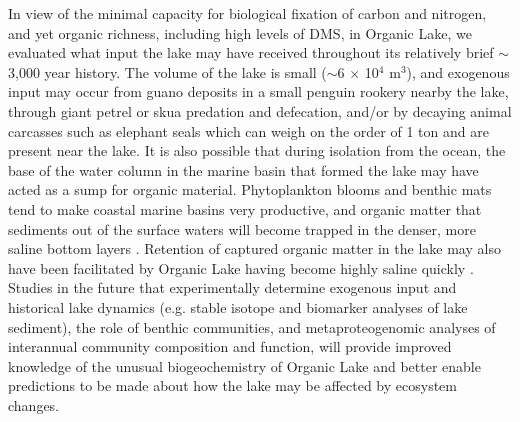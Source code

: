 In view of the minimal capacity for biological fixation of carbon and nitrogen, and yet organic richness, including high levels of \ac{DMS}, in Organic Lake, we evaluated what input the lake may have received throughout its relatively brief $\sim$3,000 year history. 
The volume of the lake is small ($\sim$6 $\times$ 10$^4$ m$^3$), and exogenous input may occur from guano deposits in a small penguin rookery nearby the lake, through giant petrel or skua predation and defecation, and/or by decaying animal carcasses such as elephant seals which can weigh on the order of 1 ton and are present near the lake. 
It is also possible that during isolation from the ocean, the base of the water column in the marine basin that formed the lake may have acted as a sump for organic material. 
Phytoplankton blooms and benthic mats tend to make coastal marine basins very productive, and organic matter that sediments out of the surface waters will become trapped in the denser, more saline bottom layers \cite{Bird1991}. 
Retention of captured organic matter in the lake may also have been facilitated by Organic Lake having become highly saline quickly \cite{Bird1991}. 
Studies in the future that experimentally determine exogenous input and historical lake dynamics (e.g. stable isotope and biomarker analyses of lake sediment), the role of benthic communities, and metaproteogenomic analyses of interannual community composition and function, will provide improved knowledge of the unusual biogeochemistry of Organic Lake and better enable predictions to be made about how the lake may be affected by ecosystem changes.


